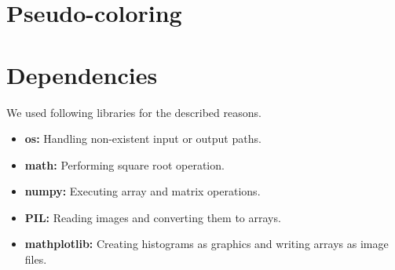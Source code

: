 \documentclass[conference]{IEEEtran}
\begin{document}
\section{Pseudo-coloring}

\section{Dependencies}
We used following libraries for the described reasons.
\begin{itemize}
	\item \textbf{os:} Handling non-existent input or output paths.
	\item \textbf{math:} Performing square root operation.
	\item \textbf{numpy:} Executing array and matrix operations.
	\item \textbf{PIL:} Reading images and converting them to arrays.
	\item \textbf{mathplotlib:} Creating histograms as graphics and writing arrays as image files.
\end{itemize}
\end{document}
